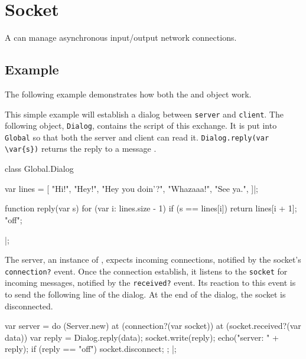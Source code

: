 
\section{Socket}

A  can manage asynchronous input/output network connections.

\subsection{Example}

The following example demonstrates how both the  and
 object work.

This simple example will establish a dialog between \lstinline|server| and
\lstinline|client|.  The following object, \lstinline|Dialog|, contains the
script of this exchange.  It is put into \lstinline|Global| so that both the
server and client can read it.  \lstinline|Dialog.reply(var \var{s})|
returns the reply to a message .

\begin{urbiscript}
class Global.Dialog
{
  var lines =
  [
    "Hi!",
    "Hey!",
    "Hey you doin'?",
    "Whazaaa!",
    "See ya.",
  ]|;

  function reply(var s)
  {
    for (var i: lines.size - 1)
      if (s == lines[i])
        return lines[i + 1];
    "off";
  }
}|;
\end{urbiscript}

The server, an instance of , expects incoming connections,
notified by the socket's \lstinline|connection?| event.  Once the connection
establish, it listens to the \lstinline|socket| for incoming messages,
notified by the \lstinline|received?| event.  Its reaction to this event is
to send the following line of the dialog.  At the end of the dialog, the
socket is disconnected.

\begin{urbiscript}
var server =
  do (Server.new)
  {
    at (connection?(var socket))
      at (socket.received?(var data))
      {
        var reply = Dialog.reply(data);
        socket.write(reply);
        echo("server: " + reply);
        if (reply == "off")
          socket.disconnect;
      };
  }|;
\end{urbiscript}

